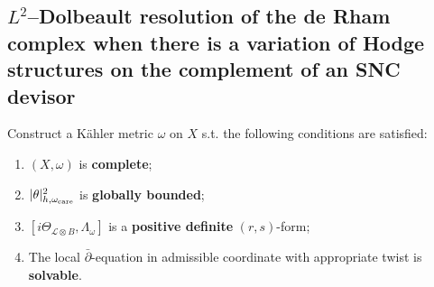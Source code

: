 \documentclass[lang=en,12pt]{beautybook}
\begin{document}
\subsection{\texorpdfstring{$L^2$}{}--Dolbeault resolution of the de Rham complex when there is a variation of Hodge structures on the complement of an SNC devisor}

\begin{fancybox}
  \begin{center}
  \end{center}
  Construct a K\"ahler metric $\omega$ on $X$ s.t. the following conditions
  are satisfied:
  \begin{enumerate}
    \item $(X, \omega)$ is \textbf{complete};

    \item $| \theta |^2_{h, \omega_{\operatorname{care}}} $ is \textbf{globally bounded};

    \item $[i \Theta_{\mathcal{L} \otimes B}, \Lambda_{\omega}]$ is a \textbf{positive
            definite} $(r, s)$-form;

    \item The local $\bar{\partial}$-equation in admissible coordinate with
          appropriate twist is \textbf{solvable}.
  \end{enumerate}
\end{fancybox}
\end{document}
